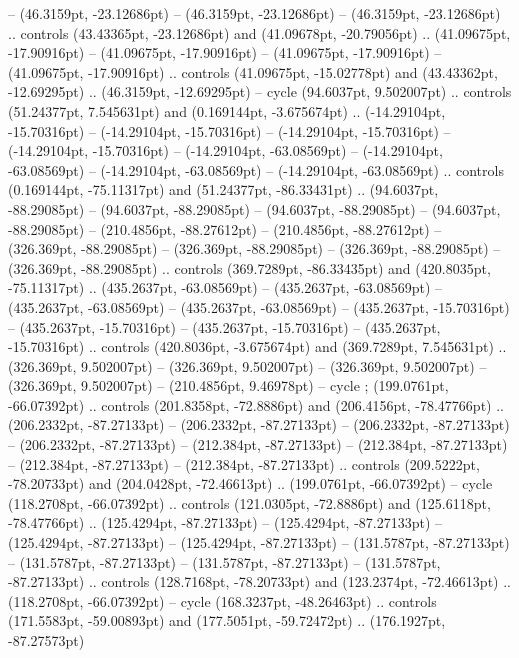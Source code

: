  -- (46.3159pt, -23.12686pt)
 -- (46.3159pt, -23.12686pt)
 -- (46.3159pt, -23.12686pt) .. controls (43.43365pt, -23.12686pt) and (41.09678pt, -20.79056pt) .. (41.09675pt, -17.90916pt)
 -- (41.09675pt, -17.90916pt)
 -- (41.09675pt, -17.90916pt)
 -- (41.09675pt, -17.90916pt) .. controls (41.09675pt, -15.02778pt) and (43.43362pt, -12.69295pt) .. (46.3159pt, -12.69295pt) -- cycle
(94.6037pt, 9.502007pt) .. controls (51.24377pt, 7.545631pt) and (0.169144pt, -3.675674pt) .. (-14.29104pt, -15.70316pt)
 -- (-14.29104pt, -15.70316pt)
 -- (-14.29104pt, -15.70316pt)
 -- (-14.29104pt, -15.70316pt)
 -- (-14.29104pt, -63.08569pt)
 -- (-14.29104pt, -63.08569pt)
 -- (-14.29104pt, -63.08569pt)
 -- (-14.29104pt, -63.08569pt) .. controls (0.169144pt, -75.11317pt) and (51.24377pt, -86.33431pt) .. (94.6037pt, -88.29085pt)
 -- (94.6037pt, -88.29085pt)
 -- (94.6037pt, -88.29085pt)
 -- (94.6037pt, -88.29085pt)
 -- (210.4856pt, -88.27612pt)
 -- (210.4856pt, -88.27612pt)
 -- (326.369pt, -88.29085pt)
 -- (326.369pt, -88.29085pt)
 -- (326.369pt, -88.29085pt)
 -- (326.369pt, -88.29085pt) .. controls (369.7289pt, -86.33435pt) and (420.8035pt, -75.11317pt) .. (435.2637pt, -63.08569pt)
 -- (435.2637pt, -63.08569pt)
 -- (435.2637pt, -63.08569pt)
 -- (435.2637pt, -63.08569pt)
 -- (435.2637pt, -15.70316pt)
 -- (435.2637pt, -15.70316pt)
 -- (435.2637pt, -15.70316pt)
 -- (435.2637pt, -15.70316pt) .. controls (420.8036pt, -3.675674pt) and (369.7289pt, 7.545631pt) .. (326.369pt, 9.502007pt)
 -- (326.369pt, 9.502007pt)
 -- (326.369pt, 9.502007pt)
 -- (326.369pt, 9.502007pt)
 -- (210.4856pt, 9.46978pt) -- cycle
;
(199.0761pt, -66.07392pt) .. controls (201.8358pt, -72.8886pt) and (206.4156pt, -78.47766pt) .. (206.2332pt, -87.27133pt)
 -- (206.2332pt, -87.27133pt)
 -- (206.2332pt, -87.27133pt)
 -- (206.2332pt, -87.27133pt)
 -- (212.384pt, -87.27133pt)
 -- (212.384pt, -87.27133pt)
 -- (212.384pt, -87.27133pt)
 -- (212.384pt, -87.27133pt) .. controls (209.5222pt, -78.20733pt) and (204.0428pt, -72.46613pt) .. (199.0761pt, -66.07392pt) -- cycle
(118.2708pt, -66.07392pt) .. controls (121.0305pt, -72.8886pt) and (125.6118pt, -78.47766pt) .. (125.4294pt, -87.27133pt)
 -- (125.4294pt, -87.27133pt)
 -- (125.4294pt, -87.27133pt)
 -- (125.4294pt, -87.27133pt)
 -- (131.5787pt, -87.27133pt)
 -- (131.5787pt, -87.27133pt)
 -- (131.5787pt, -87.27133pt)
 -- (131.5787pt, -87.27133pt) .. controls (128.7168pt, -78.20733pt) and (123.2374pt, -72.46613pt) .. (118.2708pt, -66.07392pt) -- cycle
(168.3237pt, -48.26463pt) .. controls (171.5583pt, -59.00893pt) and (177.5051pt, -59.72472pt) .. (176.1927pt, -87.27573pt)

